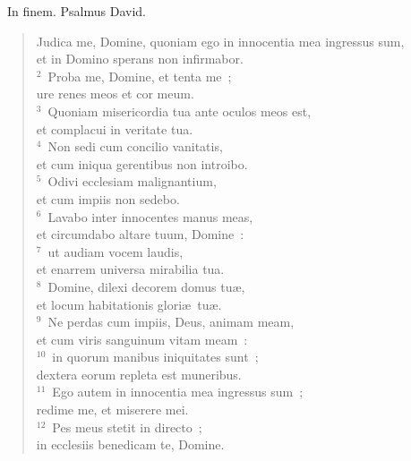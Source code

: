 ~\lettrine[lines=10,image=true,loversize=0.05,lraise=-0.03]{I}{}n finem. Psalmus David. \begin{flushleft}\begin{verse}\vspace{6pt}Judica me, Domine, quoniam ego in innocentia mea ingressus sum,\\ et in Domino sperans non infirmabor.\\
${}^{2}$~Proba me, Domine, et tenta me~;\\ ure renes meos et cor meum.\\
${}^{3}$~Quoniam misericordia tua ante oculos meos est,\\ et complacui in veritate tua.\\
${}^{4}$~Non sedi cum concilio vanitatis,\\ et cum iniqua gerentibus non introibo.\\
${}^{5}$~Odivi ecclesiam malignantium,\\ et cum impiis non sedebo.\\
${}^{6}$~Lavabo inter innocentes manus meas,\\ et circumdabo altare tuum, Domine~:\\
${}^{7}$~ut audiam vocem laudis,\\ et enarrem universa mirabilia tua.\\
${}^{8}$~Domine, dilexi decorem domus tu\ae ,\\ et locum habitationis glori\ae\ tu\ae .\\
${}^{9}$~Ne perdas cum impiis, Deus, animam meam,\\ et cum viris sanguinum vitam meam~:\\
${}^{10}$~in quorum manibus iniquitates sunt~;\\ dextera eorum repleta est muneribus.\\
${}^{11}$~Ego autem in innocentia mea ingressus sum~;\\ redime me, et miserere mei.\\
${}^{12}$~Pes meus stetit in directo~;\\ in ecclesiis benedicam te, Domine.\end{verse}\end{flushleft}


